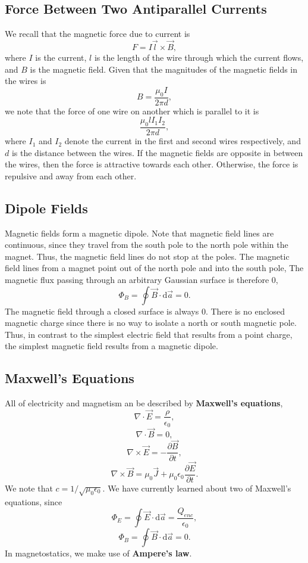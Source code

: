 \documentclass[11pt]{article}
\theoremstyle{plain} %
\theoremstyle{definition}
\theoremstyle{example}
\theoremstyle{remark}
\begin{document}
\subsection{Force Between Two Antiparallel Currents}

We recall that the magnetic force due to current is 
$$F = I\vec{l} \times \vec{B},$$
where $I$ is the current, $l$ is the length of the wire through which the current flows, and $B$ is the magnetic field. Given that the magnitudes of the magnetic fields in the wires is 
$$B = \frac{\mu_0I}{2\pi d},$$
we note that the force of one wire on another which is parallel to it is 
$$\frac{\mu_0 l I_1I_2}{2\pi d},$$ where 
$I_1$ and $I_2$ denote the current in the first and second wires respectively, and $d$ is the distance between the wires. If the magnetic fields are opposite in between the wires, then the force is attractive towards each other. Otherwise, the force is repulsive and away from each other. 


\subsection{Dipole Fields}
Magnetic fields form a magnetic dipole. Note that magnetic field lines are continuous, since they travel from the south pole to the north pole within the magnet. Thus, the magnetic field lines do not stop at the poles. The magnetic field lines from a magnet point out of the north pole 
and into the south pole, The magnetic flux passing through an arbitrary Gaussian surface is therefore 0, 
$$\Phi_B = \oint\vec{B}\cdot\mathrm d \vec{a} = 0.$$
The magnetic field through a closed surface is always 0. There is no enclosed magnetic charge since there is no way to isolate a north or south magnetic pole. Thus, in contrast to the simplest electric field that results from a point charge, the simplest magnetic field results from a magnetic dipole. 

\subsection{Maxwell's Equations}
All of electricity and magnetism an be described by \textbf{Maxwell's equations}, 
$$\nabla \cdot \vec{E} = \frac{\rho}{\epsilon_0},$$
$$\nabla \cdot \vec{B} = 0,$$
$$\nabla \times \vec{E} = -\frac{\partial \vec{B}}{\partial t},$$
$$\nabla \times \vec{B} = \mu_0\vec{J} + \mu_0\epsilon_0\frac{\partial \vec{E}}{\partial t}.$$
We note that $c = 1/\sqrt{\mu_0\epsilon_0}$. We have currently learned about two of Maxwell's equations, since 
$$\Phi_E = \oint \vec{E} \cdot \mathrm d \vec{a} = \frac{Q_{enc}}{\epsilon_0},$$
$$\Phi_B = \oint \vec{B} \cdot \mathrm d \vec{a} = 0.$$
In magnetostatics, we make use of \textbf{Ampere's law}. 
\end{document}
